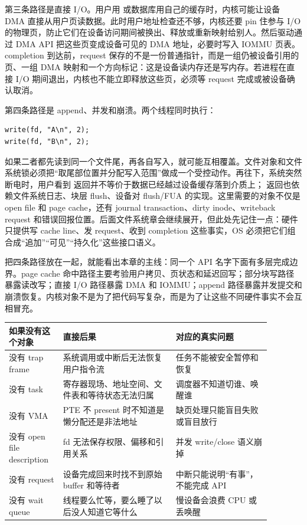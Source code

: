 第三条路径是直接 I/O。用户用  或数据库用自己的缓存时，内核可能让设备 DMA 直接从用户页读数据。此时用户地址检查还不够，内核还要 pin 住参与 I/O 的物理页，防止它们在设备访问期间被换出、释放或重新映射给别人。然后驱动通过 DMA API 把这些页变成设备可见的 DMA 地址，必要时写入 IOMMU 页表。completion 到达前，request 保存的不是一份普通指针，而是一组仍被设备引用的页、一组 DMA 映射和一个方向标记：这是设备读内存还是写内存。若进程在直接 I/O 期间退出，内核也不能立即释放这些页，必须等 request 完成或被设备确认取消。

第四条路径是 append、并发和崩溃。两个线程同时执行：

\begin{lstlisting}
write(fd, "A\n", 2);
write(fd, "B\n", 2);
\end{lstlisting}

如果二者都先读到同一个文件尾，再各自写入，就可能互相覆盖。文件对象和文件系统锁必须把“取尾部位置并分配写入范围”做成一个受控动作。再往下，系统突然断电时，用户看到  返回并不等价于数据已经越过设备缓存落到介质上； 返回也依赖文件系统日志、块层 flush、设备对 flush/FUA 的实现。这里需要的对象不仅是 open file 和 page cache，还有 journal transaction、dirty inode、writeback request 和错误回报位置。后面文件系统章会继续展开，但此处先记住一点：硬件只提供写 cache line、发 request、收到 completion 这些事实，OS 必须把它们组合成“追加”“可见”“持久化”这些接口语义。

把四条路径放在一起，就能看出本章的主线：同一个 API 名字下面有多层完成边界。page cache 命中路径主要考验用户拷贝、页状态和延迟回写；部分块写路径暴露读改写；直接 I/O 路径暴露 DMA 和 IOMMU；append 路径暴露并发提交和崩溃恢复。内核对象不是为了把代码写复杂，而是为了让这些不同硬件事实不会互相冒充。

\begin{longtable}{p{0.18\linewidth}p{0.38\linewidth}p{0.32\linewidth}}
\toprule
如果没有这个对象 & 直接后果 & 对应的真实问题 \\
\midrule
没有 trap frame & 系统调用或中断后无法恢复用户指令流 & 任务不能被安全暂停和恢复 \\
没有 task & 寄存器现场、地址空间、文件表和等待状态无法归属 & 调度器不知道切谁、唤醒谁 \\
没有 VMA & PTE 不 present 时不知道是懒分配还是非法地址 & 缺页处理只能盲目失败或盲目放行 \\
没有 open file description & fd 无法保存权限、偏移和引用关系 & 并发 write/close 语义崩掉 \\
没有 request & 设备完成回来时找不到原始 buffer 和等待者 & 中断只能说明“有事”，不能完成 API \\
没有 wait queue & 线程要么忙等，要么睡了以后没人知道它等什么 & 慢设备会浪费 CPU 或丢唤醒 \\
\bottomrule
\end{longtable}

